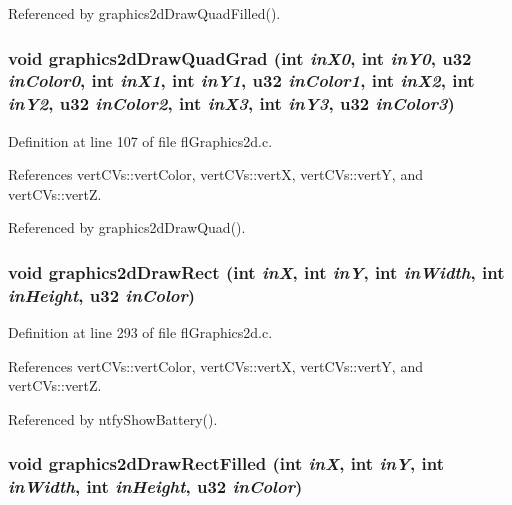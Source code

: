 Referenced by graphics2d\-Draw\-Quad\-Filled().
\subsubsection{\setlength{\rightskip}{0pt plus 5cm}void graphics2d\-Draw\-Quad\-Grad (int {\em in\-X0}, int {\em in\-Y0}, u32 {\em in\-Color0}, int {\em in\-X1}, int {\em in\-Y1}, u32 {\em in\-Color1}, int {\em in\-X2}, int {\em in\-Y2}, u32 {\em in\-Color2}, int {\em in\-X3}, int {\em in\-Y3}, u32 {\em in\-Color3})}\label{flGraphics2d_8c_21343e825ae31bc9f80b14f0ccc0e4e6}




Definition at line 107 of file fl\-Graphics2d.c.

References vert\-CVs::vert\-Color, vert\-CVs::vert\-X, vert\-CVs::vert\-Y, and vert\-CVs::vert\-Z.

Referenced by graphics2d\-Draw\-Quad().
\subsubsection{\setlength{\rightskip}{0pt plus 5cm}void graphics2d\-Draw\-Rect (int {\em in\-X}, int {\em in\-Y}, int {\em in\-Width}, int {\em in\-Height}, u32 {\em in\-Color})}\label{flGraphics2d_8c_32b7a6e54f6fda2ea7210fca6e0c3e04}




Definition at line 293 of file fl\-Graphics2d.c.

References vert\-CVs::vert\-Color, vert\-CVs::vert\-X, vert\-CVs::vert\-Y, and vert\-CVs::vert\-Z.

Referenced by ntfy\-Show\-Battery().
\subsubsection{\setlength{\rightskip}{0pt plus 5cm}void graphics2d\-Draw\-Rect\-Filled (int {\em in\-X}, int {\em in\-Y}, int {\em in\-Width}, int {\em in\-Height}, u32 {\em in\-Color})}\label{flGraphics2d_8c_ea93dd1ab20e3d997f5a663690ed5386}




